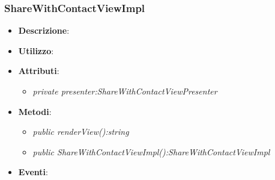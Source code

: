 \subsubsection{ShareWithContactViewImpl}
\begin{itemize}
\item \textbf{Descrizione}: 
\item \textbf{Utilizzo}:
\item \textbf{Attributi}: 
\begin{itemize}
\item \textit{private presenter:ShareWithContactViewPresenter}\\

\end{itemize}
\item \textbf{Metodi}:
\begin{itemize}
\item \textit{public renderView():string}\\

\item \textit{public ShareWithContactViewImpl():ShareWithContactViewImpl}\\

\end{itemize}
\item \textbf{Eventi}:
\end{itemize}

